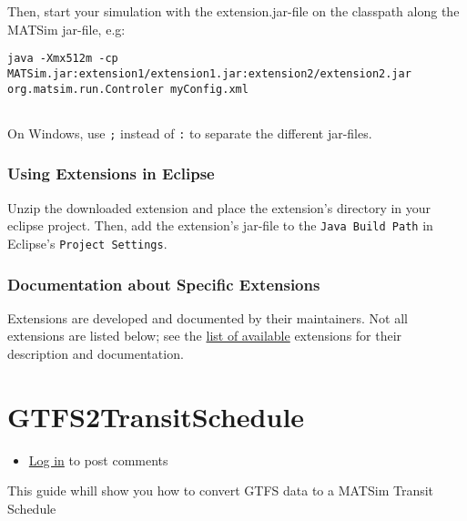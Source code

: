 \documentclass[a4paper,11pt]{report}
\begin{document}
Then, start your simulation with the extension.jar-file on the classpath along the MATSim jar-file, e.g:
\begin{verbatim}
java -Xmx512m -cp MATSim.jar:extension1/extension1.jar:extension2/extension2.jar org.matsim.run.Controler myConfig.xml


\end{verbatim}

On Windows, use 
\texttt{;} instead of 
\texttt{:} to separate the different jar-files.

\subsubsection{Using Extensions in Eclipse}

Unzip the downloaded extension and place the extension's directory in  your eclipse project. Then, add the extension's jar-file to the 
\texttt{Java Build Path} in Eclipse's 
\texttt{Project Settings}.

\subsubsection{Documentation about Specific Extensions}

Extensions are developed and documented by their maintainers. Not all extensions are listed below; see the \href{http://www.matsim.org/extensions}{list of available} extensions for their description and documentation.



\vfill\eject
\section{GTFS2TransitSchedule}
\begin{itemize}
	\item \href{http://www.matsim.org/user/login?destination=comment/reply/681%23comment-form}{Log in} to post comments
\end{itemize}

This guide whill show you how to convert GTFS data to a MATSim Transit Schedule
\end{document}
